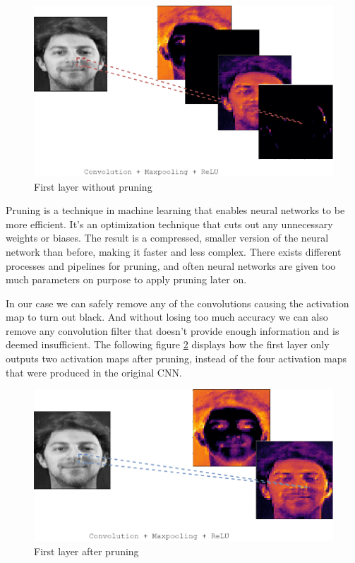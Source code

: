 \begin{figure}[H]
  \includegraphics[scale=0.4]{fig/pruning_before.png}
  \centering
  \caption{First layer without pruning}
  \label{fig:pruning_before}
\end{figure}

Pruning is a technique in machine learning that enables neural networks to be more efficient. It's an optimization technique that cuts out any unnecessary weights or biases. The result is a compressed, smaller version of the neural network than before, making it faster and less complex. There exists different processes and pipelines for pruning, and often neural networks are given too much parameters on purpose to apply pruning later on.

In our case we can safely remove any of the convolutions causing the activation map to turn out black. And without losing too much accuracy we can also remove any convolution filter that doesn't provide enough information and is deemed insufficient. The following figure \ref{fig:pruning_after} displays how the first layer only outputs two activation maps after pruning, instead of the four activation maps that were produced in the original CNN.

\begin{figure}[H]
  \includegraphics[scale=0.4]{fig/pruning_after.png}
  \centering
  \caption{First layer after pruning}
  \label{fig:pruning_after}
\end{figure}

